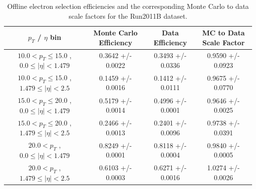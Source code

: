  \begin{table}[!ht]
 \begin{center} 
 \begin{tabular}{|c|c|c|c|}
 \hline
 $p_{T}$ / $\eta$ bin    &  Monte Carlo Efficiency    &  Data Efficiency   &  MC to Data Scale Factor \\   \hline           
$ 10.0 < p_{T} \le  15.0$ , $  0.0  \le |\eta| <   1.479$   &       0.3642 +/- 0.0022   &       0.3493 +/- 0.0336   &       0.9590 +/- 0.0923   \\   
\hline
$ 10.0 < p_{T} \le  15.0$ , $  1.479  \le |\eta| <   2.5$   &       0.1459 +/- 0.0016   &       0.1412 +/- 0.0111   &       0.9675 +/- 0.0770   \\   
\hline
$ 15.0 < p_{T} \le  20.0$ , $  0.0  \le |\eta| <   1.479$   &       0.5179 +/- 0.0014   &       0.4996 +/- 0.0001   &       0.9646 +/- 0.0025   \\   
\hline
$ 15.0 < p_{T} \le  20.0$ , $  1.479  \le |\eta| <   2.5$   &       0.2466 +/- 0.0013   &       0.2401 +/- 0.0096   &       0.9738 +/- 0.0391   \\   
\hline
$ 20.0 < p_{T} $ , $  0.0  \le |\eta| <   1.479$   &       0.8249 +/- 0.0001   &       0.8118 +/- 0.0004   &       0.9840 +/- 0.0005   \\   
\hline
$ 20.0 < p_{T} $ , $  1.479  \le |\eta| <   2.5$   &       0.6103 +/- 0.0003   &       0.6271 +/- 0.0016   &       1.0274 +/- 0.0026   \\   
\hline
\end{tabular}
\caption{Offline electron selection efficiencies and the corresponding Monte Carlo to data scale factors for the
Run2011B dataset.} 
\label{tab:eff_ele_offline_Run2011B}
\end{center}
\end{table}

